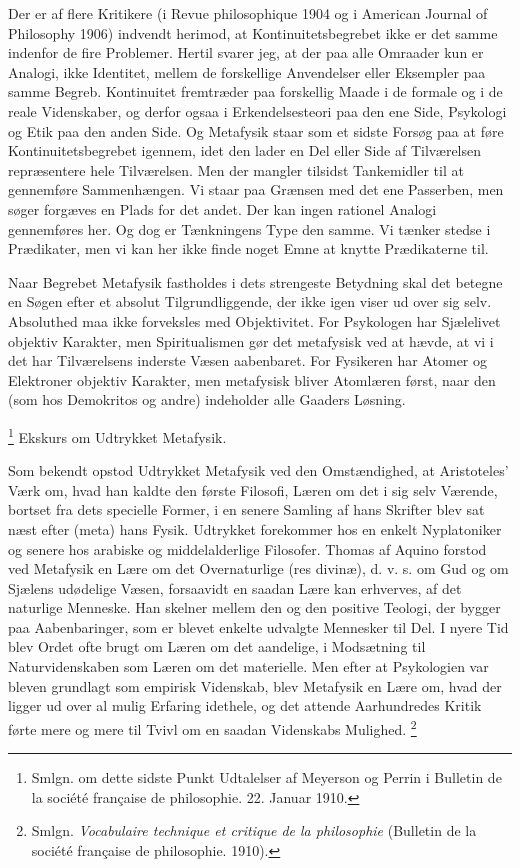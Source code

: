 \documentclass[12pt]{article}
\newcommand{\apage}[1]{\marginnote{\footnotesize\textit{[#1]}}}
\begin{document}
       Der er af flere Kritikere (i Revue philosophique 1904 og i American
Journal of Philosophy 1906) indvendt herimod, at Kontinuitetsbegrebet ikke er
det samme indenfor de fire Problemer. Hertil svarer jeg, at der paa alle
Omraader kun er Analogi, ikke Identitet, mellem de forskellige Anvendelser
eller Eksempler paa samme Begreb. Kontinuitet fremtræder paa forskellig Maade i
de formale og i de reale Videnskaber, og derfor ogsaa i
\setcounter{footnote}{0}%
\apage{85}Erkendelsesteori paa den ene Side, Psykologi og Etik paa den anden
Side. Og Metafysik staar som et sidste Forsøg paa at føre Kontinuitetsbegrebet
igennem, idet den lader en Del eller Side af Tilværelsen repræsentere hele
Tilværelsen. Men der mangler tilsidst Tankemidler til at gennemføre
Sammenhængen. Vi staar paa Grænsen med det ene Passerben, men søger forgæves en
Plads for det andet. Der kan ingen rationel Analogi gennemføres her. Og dog er
Tænkningens Type den samme. Vi tænker stedse i Prædikater, men vi kan her ikke
finde noget Emne at knytte Prædikaterne til.

Naar Begrebet Metafysik fastholdes i dets strengeste Betydning skal det betegne
en Søgen efter et absolut Tilgrundliggende, der ikke igen viser ud over sig
selv. Absoluthed maa ikke forveksles med Objektivitet. For Psykologen har
Sjælelivet objektiv Karakter, men Spiritualismen gør det metafysisk ved at
hævde, at vi i det har Tilværelsens inderste Væsen aabenbaret. For Fysikeren
har Atomer og Elektroner objektiv Karakter, men metafysisk bliver Atomlæren
først, naar den (som hos Demokritos og andre) indeholder alle Gaaders Løsning.

         \footnote{Smlgn. om dette sidste Punkt Udtalelser af Meyerson og
Perrin i Bulletin de la société française de philosophie. 22. Januar 1910.}
         Ekskurs om Udtrykket Metafysik.

Som bekendt opstod Udtrykket \guillemotright{}Metafysik\guillemotleft{} ved den
Omstændighed, at Aristoteles' Værk om, hvad han kaldte \guillemotright{}den
første Filosofi\guillemotleft{}, Læren om det i sig selv Værende, bortset fra
dets specielle Former, i en senere Samling af hans Skrifter blev sat næst efter
(meta) hans \guillemotright{}Fysik\guillemotleft{}. Udtrykket forekommer hos en
enkelt Nyplatoniker og senere hos arabiske og middelalderlige Filosofer. Thomas
af Aquino forstod ved Metafysik en Lære om det Overnaturlige (res divinæ), d.
v. s. om Gud og om Sjælens udødelige Væsen, forsaavidt en saadan Lære kan
erhverves, af det naturlige Menneske. Han skelner mellem den og den positive
Teologi, der
\setcounter{footnote}{0}%
\apage{86}bygger paa Aabenbaringer, som er blevet enkelte udvalgte Mennesker
til Del. I nyere Tid blev Ordet ofte brugt om Læren om det aandelige, i
Modsætning til Naturvidenskaben som Læren om det materielle. Men efter at
Psykologien var bleven grundlagt som empirisk Videnskab, blev Metafysik en Lære
om, hvad der ligger ud over al mulig Erfaring idethele, og det attende
Aarhundredes Kritik førte mere og mere til Tvivl om en saadan Videnskabs Mulighed.
      \footnote{Smlgn. \textit{Vocabulaire technique et critique de la
philosophie }(Bulletin de la société française de philosophie. 1910).}
\end{document}
